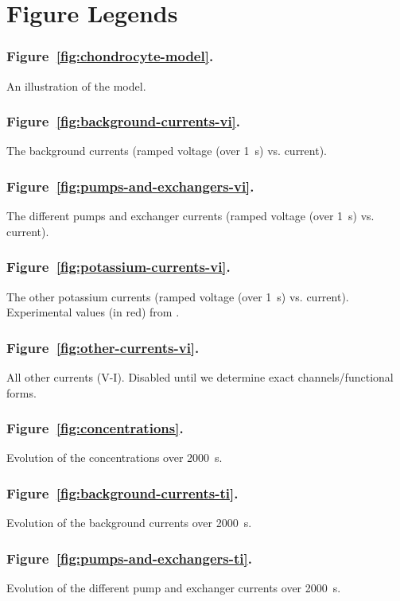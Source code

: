 \section*{Figure Legends}
\label{figures}

\subsubsection*{Figure~\ref{fig:chondrocyte-model}.}
An illustration of the model.

\subsubsection*{Figure~\ref{fig:background-currents-vi}.}
The background currents (ramped voltage (over 1~s) vs. current).

\subsubsection*{Figure~\ref{fig:pumps-and-exchangers-vi}.}
The different pumps and exchanger currents (ramped voltage (over 1~s) vs. current).

\subsubsection*{Figure~\ref{fig:potassium-currents-vi}.}
The other potassium currents (ramped voltage (over 1~s)
vs. current). Experimental values (in red) from \cite{Clarketal2011}.

\subsubsection*{Figure~\ref{fig:other-currents-vi}.}
All other currents (V-I). Disabled until we determine exact
channels/functional forms.

\subsubsection*{Figure~\ref{fig:concentrations}.}
Evolution of the concentrations over 2000~s.

\subsubsection*{Figure~\ref{fig:background-currents-ti}.}
Evolution of the background currents over 2000~s.

\subsubsection*{Figure~\ref{fig:pumps-and-exchangers-ti}.}
Evolution of the different pump and exchanger currents over 2000~s.

